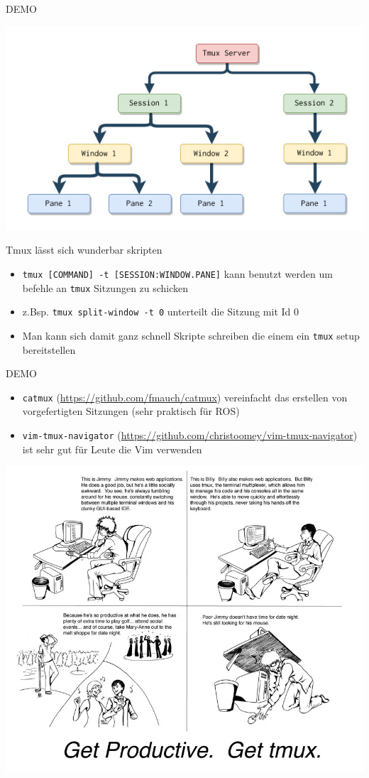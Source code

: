\documentclass[plain]{beamer}
\newcommand{\tmux}{\texttt{tmux}}
\newcommand{\demoslide}{\begin{frame}
  \center \huge DEMO
\end{frame}}
\begin{document}
\demoslide

\begin{frame}
  \center\includegraphics[width=\textwidth]{imgs/tmux-working-diagram.jpg}
\end{frame}

\begin{frame}
  Tmux lässt sich wunderbar skripten
  \begin{itemize}
    \item \texttt{tmux [COMMAND] -t [SESSION:WINDOW.PANE]} kann benutzt werden um befehle an \tmux{}
      Sitzungen zu schicken
    \item z.Bsp. \texttt{tmux split-window -t 0} unterteilt die Sitzung mit Id 0
    \item Man kann sich damit ganz schnell Skripte schreiben die einem ein \tmux{} setup bereitstellen
  \end{itemize}
\end{frame}

\demoslide{}

\begin{frame}
\begin{itemize}
  \item \texttt{catmux} (\url{https://github.com/fmauch/catmux}) vereinfacht das erstellen von
    vorgefertigten Sitzungen (sehr praktisch für ROS)
  \item \texttt{vim-tmux-navigator} (\url{https://github.com/christoomey/vim-tmux-navigator}) ist
    sehr gut für Leute die Vim verwenden
\end{itemize}
\end{frame}

\begin{frame}
  \includegraphics[width=\textwidth]{imgs/tmux_final_meme.png}
\end{frame}
\end{document}

